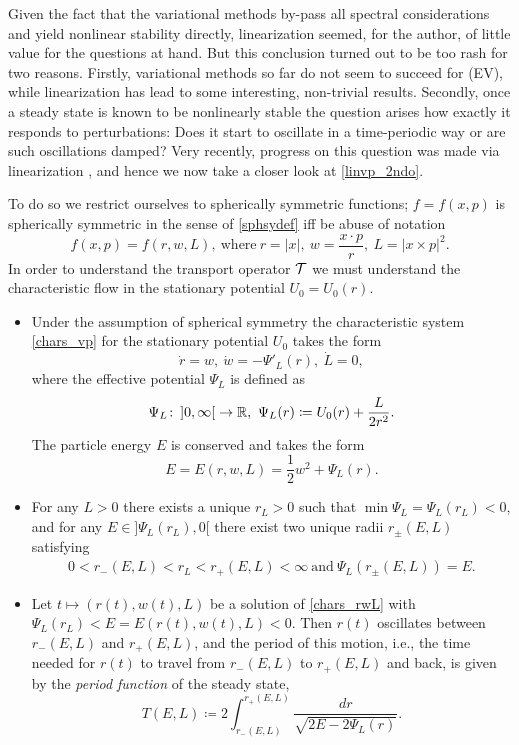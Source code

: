 \documentclass[11pt]{article}
\begin{document}
Given the fact that the variational methods by-pass all spectral
considerations and yield nonlinear stability directly, linearization
seemed, for the author, of little value for the questions at hand. But this
conclusion turned out to be too rash for two reasons.
Firstly, variational methods so far do not seem to succeed for (EV),
while linearization has lead to some interesting, non-trivial results.
Secondly, once a steady state is known to be nonlinearly stable
the question arises how exactly it responds to perturbations:
Does it start to oscillate in a time-periodic way or are such oscillations
damped? Very recently, progress on this question was made via linearization
\cite{HaReSchrStr2023,HaStrRe2022,Kunze},
and hence we now take a closer look at \eqref{linvp_2ndo}.

To do so we restrict ourselves to spherically symmetric functions;
$f=f(x,p)$ is spherically symmetric in the sense of \eqref{sphsydef} iff
be abuse of notation
\[ 
f(x,p) = f(r,w,L),\
\mbox{where}\ r=|x|,\ w=\frac{x\cdot p}{r},\ L=|x\times p|^2 .
\]
In order to understand the transport operator ${\cal T}$ we must understand
the characteristic flow in the stationary potential $U_0=U_0(r)$.
%
%
\begin{lemma} \label{sphsymmchar}
  \begin{itemize}
  \item[(a)]
    Under the assumption of spherical symmetry the characteristic system
    \eqref{chars_vp} for the stationary potential $U_0$ takes the form
    \begin{equation}\label{chars_rwL}
    \dot r = w,\ \dot w = - \Psi'_L(r),\ \dot L =0, 
    \end{equation}
    where the effective potential $\Psi_L$ is defined as
    \[ 
    \Psi_L \colon \left] 0, \infty \right[ \to \mathbb R ,\
    \Psi_L(r) \coloneqq U_0(r) + \frac L{2 r^2}.
    \]
    The particle energy $E$ is conserved and takes the form
    \[
    E=E(r,w,L)=\frac{1}{2} w^2 + \Psi_L(r).
    \]
  \item[(b)]
    For any $L>0$ there exists a unique ${r_L} > 0$ such that 
     $\min \Psi_L = \Psi_L(r_L) < 0$,
    and for any $E \in ] \Psi_L (r_L) , 0 [$
    there exist two unique radii ${r_\pm (E,L)}$ satisfying
    \begin{align*}
      0 < r_-(E,L) < r_L < r_+(E,L) < \infty\ \mbox{and}\
      \Psi_L (r_\pm(E,L)) = E.
    \end{align*}
  \item[(c)]
    Let $t \mapsto (r(t), w(t), L)$ be a solution of
    \eqref{chars_rwL}
    with $\Psi_L(r_L)< E = E(r(t), w(t), L)<0$.
    Then $r(t)$ oscillates between $r_-(E,L)$ and $r_+(E,L)$,
    and the period of this motion, i.e., the time needed for $r(t)$ to
    travel from $r_-(E,L)$ to $r_+(E,L)$ and back, is given
    by the {\em period function} of the steady state,
    \[ 
    T(E,L) \coloneqq 2 \int_{r_-(E,L)}^{r_+(E,L)} \frac{dr}{\sqrt{2E - 2\Psi_L(r)}}.
    \]
  \end{itemize}
\end{lemma}
\end{document}
